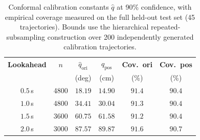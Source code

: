 \begin{table}[t]
\centering
\caption{Conformal calibration constants $\hat{q}$ at 90\% confidence, with empirical coverage measured on the full held-out test set (45 trajectories). Bounds use the hierarchical repeated-subsampling construction over 200 independently generated calibration trajectories.}
\label{tab:calibration}
\begin{tabular}{cccccc}
\toprule
\textbf{Lookahead} & $n$ & $\hat{q}_{\mathrm{ori}}$ & $\hat{q}_{\mathrm{pos}}$ & \textbf{Cov.\ ori} & \textbf{Cov.\ pos} \\
 & & (deg) & (cm) & (\%) & (\%) \\
\midrule
$0.5$\,s & 4800 & $18.19$ & $14.90$ & $91.4$ & $90.4$ \\
$1.0$\,s & 4800 & $34.41$ & $30.04$ & $91.3$ & $90.4$ \\
$1.5$\,s & 3600 & $60.75$ & $61.58$ & $91.2$ & $90.4$ \\
$2.0$\,s & 3000 & $87.57$ & $89.87$ & $91.6$ & $90.7$ \\
\bottomrule
\end{tabular}
\end{table}